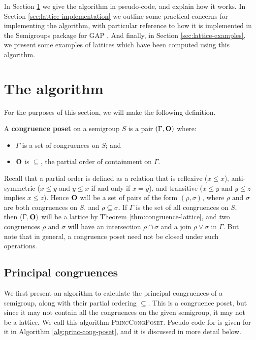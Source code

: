 In Section \ref{sec:lattice-algorithm} we give the algorithm in pseudo-code, and
explain how it works.  In Section \ref{sec:lattice-implementation} we outline
some practical concerns for implementing the algorithm, with particular
reference to how it is implemented in the Semigroups package \cite{semigroups}
for GAP \cite{gap}.  And finally, in Section \ref{sec:lattice-examples}, we
present some examples of lattices which have been computed using this algorithm.

\section{The algorithm}
\label{sec:lattice-algorithm}

For the purposes of this section, we will make the following definition.

\begin{definition}
  \label{def:congruence-poset}
  A \textbf{congruence poset} on a semigroup $S$ is a pair $(\Gamma, \mathbf{O})$
  where:
  \begin{itemize}
  \item $\Gamma$ is a set of congruences on $S$; and
  \item $\mathbf{O}$ is $\subseteq$, the partial order of containment on $\Gamma$.
  \end{itemize}
\end{definition}

Recall that a partial order is defined as a relation that is reflexive
($x \leq x$), anti-symmetric ($x \leq y$ and $y \leq x$ if and only if $x = y$),
and transitive ($x \leq y$ and $y \leq z$ implies $x \leq z$).
Hence $\mathbf{O}$ will be a set of pairs of the form $(\rho, \sigma)$, where $\rho$
and $\sigma$ are both congruences on $S$, and $\rho \subseteq \sigma$.  If
$\Gamma$ is the set of all congruences on $S$, then $(\Gamma, \mathbf{O})$ will be a
lattice by Theorem \ref{thm:congruence-lattice}, and two congruences $\rho$ and
$\sigma$ will have an intersection $\rho \cap \sigma$ and a join
$\rho \vee \sigma$ in $\Gamma$.  But note that in general, a congruence poset
need not be closed under such operations.

\subsection{Principal congruences}
\label{sec:princ-cong-poset}

We first present an algorithm to calculate the principal congruences of a
semigroup, along with their partial ordering $\subseteq$.  This is a congruence
poset, but since it may not contain all the congruences on the given semigroup,
it may not be a lattice.  We call this algorithm \textsc{PrincCongPoset}.
Pseudo-code for is given for it in Algorithm \ref{alg:princ-cong-poset}, and it
is discussed in more detail below.

